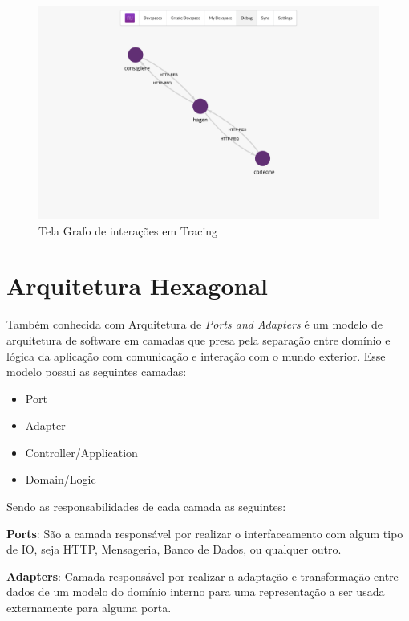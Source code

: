        \begin{figure}[htb]
    		\caption{\label{fig_frontend_tracing}Tela Grafo de interações em Tracing}
    		\begin{center}
    		\includegraphics[width=\textwidth,keepaspectratio]{pictures/frontend/frontend-tracing.png}
    		\end{center}
    	\end{figure}

	\section{Arquitetura Hexagonal}
	
	    Também conhecida com Arquitetura de \textit{Ports and Adapters} é um modelo de arquitetura de software em camadas que presa pela separação entre domínio e lógica da aplicação com comunicação e interação com o mundo exterior. Esse modelo possui as seguintes camadas:
	
    	\begin{itemize}
    	    \item Port
    	    \item Adapter
    	    \item Controller/Application
    	    \item Domain/Logic
    	\end{itemize}
	
    	Sendo as responsabilidades de cada camada as seguintes:
    	
    	\textbf{Ports}: São a camada responsável por realizar o interfaceamento com algum tipo de IO, seja HTTP, Mensageria, Banco de Dados, ou qualquer outro.
    	
    	\textbf{Adapters}: Camada responsável por realizar a adaptação e transformação entre dados de um modelo do domínio interno para uma representação a ser usada externamente para alguma porta.
    	
